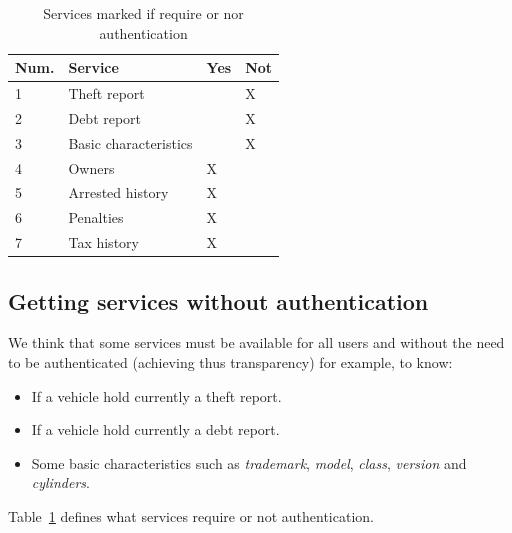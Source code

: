 \begin{table}[htb]
\footnotesize
    \begin{center}
    \caption{Services marked if require or nor authentication }
    \label{table:servicesPermits}
        \begin{tabular}{l|l|l|l}
			\textbf{Num.}&\textbf{Service}		 &Yes    &Not    \\ \hline
             1			 &Theft report           &       &X      \\ \hline
             2			 &Debt report            &       &X       \\ \hline
             3			 &Basic characteristics  &       &X       \\ \hline
             4			 &Owners                 &X      &       \\ \hline
             5			 &Arrested history       &X      &       \\ \hline
             6			 &Penalties              &X      &       \\ \hline
             7			 &Tax history            &X      &       \\ \hline
        \end{tabular}
    \end{center}
\end{table}


\subsection{Getting services without authentication}
\label{ssec:getServNoAuth}
We think that some services must be available for all users and without the need to be 
authenticated (achieving thus transparency) for example, to know:
\begin{itemize}
    \item If a vehicle hold currently a theft report.
    \item If a vehicle hold currently a debt report.
    \item Some basic characteristics such as \textit{trademark}, \textit{model}, 
        \textit{class}, \textit{version} and \textit{cylinders}.
\end{itemize}
Table~\ref{table:servicesPermits} defines what services require or not authentication.

